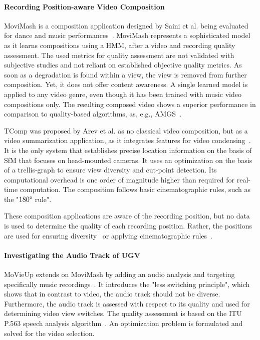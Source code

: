 \paragraph{Recording Position-aware Video Composition}
MoviMash is a composition application designed by Saini et al. being evaluated for dance and music performances~\cite{Saini2012}.
MoviMash represents a sophisticated model as it learns compositions using a \ac{HMM}, after a video and recording quality assessment.
The used metrics for quality assessment are not validated with subjective studies and not reliant on established objective quality metrics.
As soon as a degradation is found within a view, the view is removed from further composition.
Yet, it does not offer content awareness. 
A single learned model is applied to any video genre, even though it has been trained with music video compositions only.
The resulting composed video shows a superior performance in comparison to quality-based algorithms, as, e.g., \ac{AMGS}~\cite{Shrestha2010}.

TComp was proposed by Arev et al. as no classical video composition, but as a video summarization application, as it integrates features for video condensing~\cite{Arev2014}. 
It is the only system that establishes precise location information on the basis of \ac{SfM} that focuses on head-mounted cameras.
It uses an optimization on the basis of a trellis-graph to ensure view diversity and cut-point detection.
Its computational overhead is one order of magnitude higher than required for real-time computation.
The composition follows basic cinematographic rules, such as the "$180\degree$ rule".

These composition applications are aware of the recording position, but no data is used to determine the quality of each recording position.
Rather, the positions are used for ensuring diversity~\cite{Saini2012} or applying cinematographic rules~\cite{Arev2014}.

\paragraph{Investigating the Audio Track of \ac{UGV}}
MoVieUp extends on MoviMash by adding an audio analysis and targeting specifically music recordings~\cite{Wu2015}.
It introduces the "less switching principle", which shows that in contrast to video, the audio track should not be diverse.
Furthermore, the audio track is assessed with respect to its quality and used for determining video view switches.
The quality assessment is based on the \ac{ITU} P.563 speech analysis algorithm~\cite{ITU-P563}.
An optimization problem is formulated and solved for the video selection.

